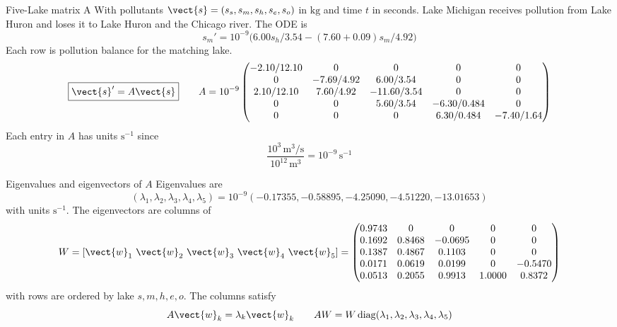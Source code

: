 \documentclass[11pt,aspectratio=169]{beamer}
\begin{document}
\begin{frame}{Five-Lake matrix A}
\small
With pollutants
$\vect{s}=(s_s,s_m,s_h,s_e,s_o)$ in $\mathrm{kg}$ and time $t$ in seconds.
Lake Michigan receives pollution from Lake Huron and loses it to Lake 
Huron and the Chicago river.  The ODE is 
\[
s_m'=10^{-9}\bigl(6.00s_h/3.54-(7.60+0.09)s_m/4.92\bigr)
\]
Each row is pollution balance for the matching lake.
\[
\boxed{\vect{s}'=A\vect{s}}
\qquad
A=10^{-9}
\begin{pmatrix}
-2.10/12.10 & 0 & 0 & 0 & 0\\
0 & -7.69/4.92 & 6.00/3.54 & 0 & 0\\
2.10/12.10 & 7.60/4.92 & -11.60/3.54 & 0 & 0\\
0 & 0 & 5.60/3.54 & -6.30/0.484 & 0\\
0 & 0 & 0 & 6.30/0.484 & -7.40/1.64
\end{pmatrix}
\]
Each entry in $A$ has units $\mathrm{s^{-1}}$ since
\[
\frac{10^3\,\mathrm{m^3/s}}{10^{12}\,\mathrm{m^3}}=10^{-9}\,\mathrm{s^{-1}}
\]
\end{frame}

\begin{frame}{Eigenvalues and eigenvectors of $A$}
\small
Eigenvalues are
\[
(\lambda_1,\lambda_2,\lambda_3,\lambda_4,\lambda_5)
=10^{-9}(-0.17355,-0.58895,-4.25090,-4.51220,-13.01653)
\]
with units $\mathrm{s^{-1}}$. The eigenvectors are columns of
\[
W=[\vect{w}_1\ \vect{w}_2\ \vect{w}_3\ \vect{w}_4\ \vect{w}_5]
=
\begin{pmatrix}
0.9743 & 0 & 0 & 0 & 0\\
0.1692 & 0.8468 & -0.0695 & 0 & 0\\
0.1387 & 0.4867 & 0.1103 & 0 & 0\\
0.0171 & 0.0619 & 0.0199 & 0 & -0.5470\\
0.0513 & 0.2055 & 0.9913 & 1.0000 & 0.8372
\end{pmatrix}
\]
with rows are ordered by lake $s,m,h,e,o$. The columns satisfy
\[
A\vect{w}_k=\lambda_k\vect{w}_k
\qquad
AW=W\operatorname{diag}(\lambda_1,\lambda_2,\lambda_3,\lambda_4,\lambda_5)
\]
\end{frame}
\end{document}
